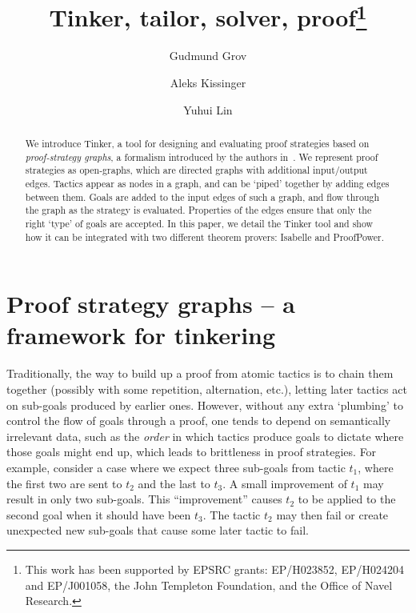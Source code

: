 \documentclass[submission,copyright,creativecommons]{eptcs}
\title{Tinker, tailor, solver, proof\thanks{This work has been supported by EPSRC grants: EP/H023852, EP/H024204 and EP/J001058, the John Templeton Foundation, and the Office of Navel Research.}}
\author{Gudmund Grov
\institute{Heriot-Watt University, Edinburgh, UK} 
\email{G.Grov@hw.ac.uk}
\and
Aleks Kissinger
\institute{University of Oxford, UK} 
\email{alek@cs.ox.ac.uk}
\and 
Yuhui Lin
\institute{Heriot-Watt University, Edinburgh, UK} 
\email{Y.Lin@hw.ac.uk}
}
\begin{document}
\maketitle

\begin{abstract}
We introduce Tinker, a tool for designing and evaluating proof strategies based on \textit{proof-strategy graphs}, a formalism introduced by the authors in~\cite{LPAR13}. We represent proof strategies as open-graphs, which are directed graphs with additional input/output edges. Tactics appear as nodes in a graph, and can be `piped' together by adding edges between them. Goals are added to the input edges of such a graph, and flow through the graph as the strategy is evaluated. Properties of the edges ensure that only the right `type' of goals are accepted. In this paper, we detail the Tinker tool and show how it can be integrated with two different theorem provers: Isabelle and ProofPower.
\end{abstract}

\section{Proof strategy graphs -- a framework for tinkering}

Traditionally, the way to build up a proof from atomic tactics is to chain them together (possibly with some repetition, alternation, etc.), letting later tactics act on sub-goals produced by earlier ones. However, without any extra `plumbing' to control the flow of goals through a proof, one tends to depend on semantically irrelevant data, such as the \textit{order} in which tactics produce goals to dictate where those goals might end up, which leads to brittleness in proof strategies. For example, consider a case where we expect three sub-goals from tactic $t_1$, where the first two are sent to $t_2$ and the last to $t_3$. A small improvement of $t_1$ may result in only two sub-goals. This ``improvement'' causes $t_2$ to be applied to the second goal when it should have been $t_3$. The tactic $t_2$ may then fail or create unexpected new sub-goals that cause some later tactic to fail.
\end{document}

